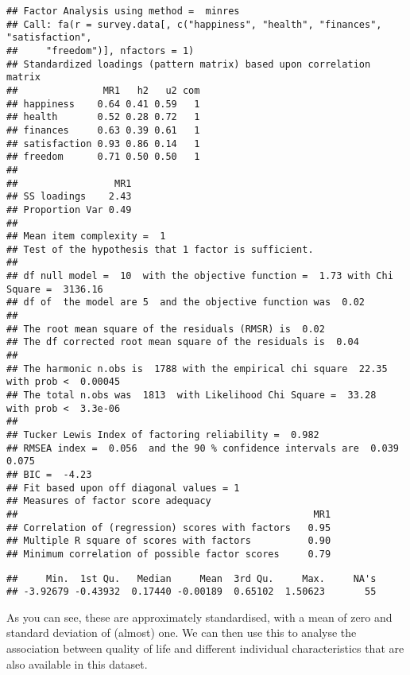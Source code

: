 \documentclass[
]{article}
\newenvironment{Shaded}{\begin{snugshade}}{\end{snugshade}}
\newcommand{\FunctionTok}[1]{\textcolor[rgb]{0.13,0.29,0.53}{\textbf{#1}}}
\newcommand{\NormalTok}[1]{#1}
\newcommand{\SpecialCharTok}[1]{\textcolor[rgb]{0.81,0.36,0.00}{\textbf{#1}}}
\begin{document}
\begin{verbatim}
## Factor Analysis using method =  minres
## Call: fa(r = survey.data[, c("happiness", "health", "finances", "satisfaction", 
##     "freedom")], nfactors = 1)
## Standardized loadings (pattern matrix) based upon correlation matrix
##               MR1   h2   u2 com
## happiness    0.64 0.41 0.59   1
## health       0.52 0.28 0.72   1
## finances     0.63 0.39 0.61   1
## satisfaction 0.93 0.86 0.14   1
## freedom      0.71 0.50 0.50   1
## 
##                 MR1
## SS loadings    2.43
## Proportion Var 0.49
## 
## Mean item complexity =  1
## Test of the hypothesis that 1 factor is sufficient.
## 
## df null model =  10  with the objective function =  1.73 with Chi Square =  3136.16
## df of  the model are 5  and the objective function was  0.02 
## 
## The root mean square of the residuals (RMSR) is  0.02 
## The df corrected root mean square of the residuals is  0.04 
## 
## The harmonic n.obs is  1788 with the empirical chi square  22.35  with prob <  0.00045 
## The total n.obs was  1813  with Likelihood Chi Square =  33.28  with prob <  3.3e-06 
## 
## Tucker Lewis Index of factoring reliability =  0.982
## RMSEA index =  0.056  and the 90 % confidence intervals are  0.039 0.075
## BIC =  -4.23
## Fit based upon off diagonal values = 1
## Measures of factor score adequacy             
##                                                    MR1
## Correlation of (regression) scores with factors   0.95
## Multiple R square of scores with factors          0.90
## Minimum correlation of possible factor scores     0.79
\end{verbatim}

\begin{Shaded}
\end{Shaded}

\begin{verbatim}
##     Min.  1st Qu.   Median     Mean  3rd Qu.     Max.     NA's 
## -3.92679 -0.43932  0.17440 -0.00189  0.65102  1.50623       55
\end{verbatim}

As you can see, these are approximately standardised, with a mean of
zero and standard deviation of (almost) one. We can then use this to
analyse the association between quality of life and different individual
characteristics that are also available in this dataset.
\end{document}
